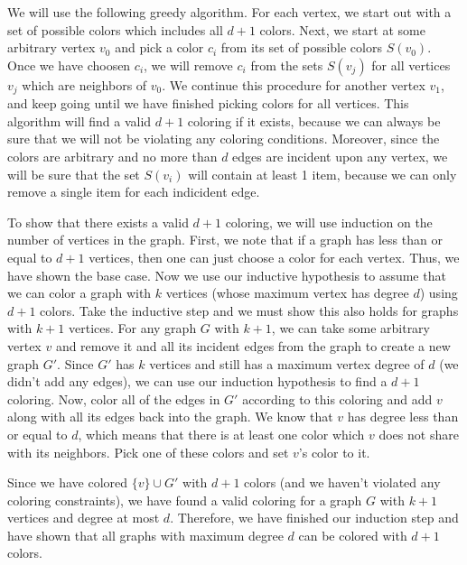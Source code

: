 \documentclass[psamsfonts]{amsart}
\newenvironment{sol}{\vspace{0.25cm}{\large \bfseries Solution:}}{\qedsymbol}
\begin{document}
\begin{sol}
We will use the following greedy algorithm. For each vertex, we start out with a set of possible colors which includes all $d+1$ colors. Next, we start at some arbitrary vertex $v_0$ and pick a color $c_i$ from its set of possible colors $S(v_0)$. Once we have choosen $c_i$, we will remove $c_i$ from the sets $S(v_j)$ for all vertices $v_j$ which are neighbors of $v_0$. We continue this procedure for another vertex $v_1$, and keep going until we have finished picking colors for all vertices. This algorithm will find a valid $d+1$ coloring if it exists, because we can always be sure that we will not be violating any coloring conditions. Moreover, since the colors are arbitrary and no more than $d$ edges are incident upon any vertex, we will be sure that the set $S(v_i)$ will contain at least 1 item, because we can only remove a single item for each indicident edge.

To show that there exists a valid $d+1$ coloring, we will use induction on the number of vertices in the graph. First, we note that if a graph has less than or equal to $d+1$ vertices, then one can just choose a color for each vertex. Thus, we have shown the base case. Now we use our inductive hypothesis to assume that we can color a graph with $k$ vertices (whose maximum vertex has degree $d$) using $d+1$ colors. Take the inductive step and we must show this also holds for graphs with $k+1$ vertices. For any graph $G$ with $k+1$, we can take some arbitrary vertex $v$ and remove it and all its incident edges from the graph to create a new graph $G'$. Since $G'$ has $k$ vertices and still has a maximum vertex degree of $d$ (we didn't add any edges), we can use our induction hypothesis to find a $d+1$ coloring. Now, color all of the edges in $G'$ according to this coloring and add $v$ along with all its edges back into the graph. We know that $v$ has degree less than or equal to $d$, which means that there is at least one color which $v$ does not share with its neighbors. Pick one of these colors and set $v$'s color to it. 

Since we have colored $\{v \} \cup G'$ with $d+1$ colors (and we haven't violated any coloring constraints), we have found a valid coloring for a graph $G$ with $k+1$ vertices and degree at most $d$. Therefore, we have finished our induction step and have shown that all graphs with maximum degree $d$ can be colored with $d+1$ colors.
\end{sol}
\end{document}

